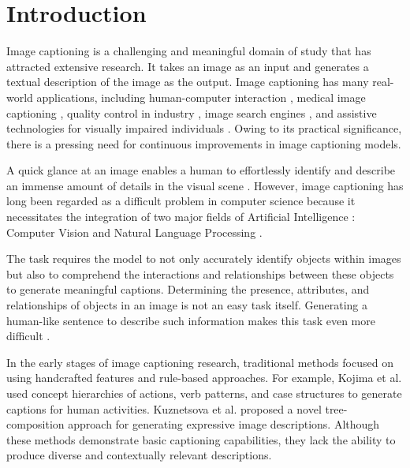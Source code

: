\documentclass[conference]{IEEEtran}
\begin{document}
\section{Introduction}
Image captioning is a challenging and meaningful domain of study that has attracted extensive research. It takes an image as an input and generates a textual description of the image as the output. Image captioning has many real-world applications, including human-computer interaction \cite{li2020oscar, zhang2021vinvl, fukui2016multimodal}, medical image captioning \cite{huang2021contextualized, pavlopoulos2019survey, karoly2006psychological}, quality control in industry \cite{luo2019visual}, image search engines \cite{iyer2019image}, and assistive technologies for visually impaired individuals \cite{dognin2020image, kim2021proceedings, ganesan2022deep, yu2023quality}. Owing to its practical significance, there is a pressing need for continuous improvements in image captioning models.


A quick glance at an image enables a human to effortlessly identify and describe an immense amount of details in the visual scene \cite{fei2007we}. However, image captioning has long been regarded as a difficult problem in computer science because it necessitates the integration of two major fields of Artificial Intelligence \cite{rinaldi2023automatic}: Computer Vision \cite{ijjina2016hybrid, wang2015feedforward} and Natural Language Processing \cite{cho2014learning, collobert2008unified}. 


The task requires the model to not only accurately identify objects within images but also to comprehend the interactions and relationships between these objects to generate meaningful captions. Determining the presence, attributes, and relationships of objects in an image is not an easy task itself. Generating a human-like sentence to describe such information makes this task even more difficult \cite{bai2018survey}.


In the early stages of image captioning research, traditional methods focused on using handcrafted features and rule-based approaches. For example, Kojima et al. \cite{kojima2002natural} used concept hierarchies of actions, verb patterns, and case structures to generate captions for human activities. Kuznetsova et al. \cite{kuznetsova2014treetalk} proposed a novel tree-composition approach for generating expressive image descriptions. Although these methods demonstrate basic captioning capabilities, they lack the ability to produce diverse and contextually relevant descriptions.
\end{document}
